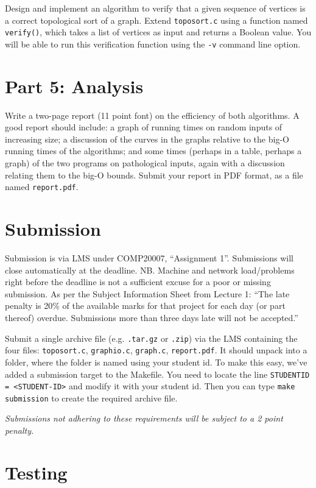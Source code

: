 \documentclass[11pt]{article}
\begin{document}
Design and implement an algorithm to verify that a given sequence of vertices is a correct topological sort of a graph.
Extend \texttt{toposort.c} using a function named \texttt{verify()},
which takes a list of vertices as input and returns a Boolean value.
You will be able to run this verification function using the \texttt{-v} command line option.

\section*{Part 5: Analysis}

Write a two-page report (11 point font) on the efficiency of both algorithms.
A good report should include:
a graph of running times on random inputs of increasing size;
a discussion of the curves in the graphs relative to the big-O running times of the algorithms;
and some times (perhaps in a table, perhaps a graph) of the two programs on pathological inputs,
again with a discussion relating them to the big-O bounds.
Submit your report in PDF format, as a file named \texttt{report.pdf}.

\section*{Submission}

Submission is via LMS under COMP20007, ``Assignment 1''.
Submissions will close automatically at the deadline.
NB\@. Machine and network load/problems right before the deadline is
not a sufficient excuse for a poor or missing submission.
As per the Subject Information Sheet from Lecture 1: ``The late penalty is 20\%
of the available marks for that project
for each day (or part thereof) overdue.
Submissions more than three days late will not be accepted.''

Submit a single archive file (e.g. \texttt{.tar.gz} or \texttt{.zip}) via the LMS containing the four files:
\texttt{toposort.c},
\texttt{graphio.c},
\texttt{graph.c},
\texttt{report.pdf}.
It should unpack into a folder, where the folder is named using your student id.
To make this easy, we've added a submission target to the Makefile.
You need to locate the line \texttt{STUDENTID = <STUDENT-ID>} and modify it with your student id.
Then you can type \texttt{make submission} to create the required archive file.

\emph{Submissions not adhering to these requirements will be subject to a 2 point penalty.}

\section*{Testing}
\end{document}
